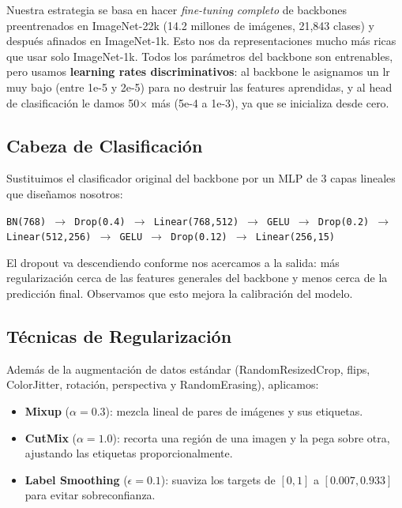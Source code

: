 \documentclass[11pt,a4paper]{article}
\begin{document}
Nuestra estrategia se basa en hacer \textit{fine-tuning completo} de backbones preentrenados en ImageNet-22k (14.2 millones de imágenes, 21,843 clases) y después afinados en ImageNet-1k. Esto nos da representaciones mucho más ricas que usar solo ImageNet-1k. Todos los parámetros del backbone son entrenables, pero usamos \textbf{learning rates discriminativos}: al backbone le asignamos un lr muy bajo (entre 1e-5 y 2e-5) para no destruir las features aprendidas, y al head de clasificación le damos 50$\times$ más (5e-4 a 1e-3), ya que se inicializa desde cero.

\subsection{Cabeza de Clasificación}

Sustituimos el clasificador original del backbone por un MLP de 3 capas lineales que diseñamos nosotros:

\begin{center}
\small
\texttt{BN(768) $\to$ Drop(0.4) $\to$ Linear(768,512) $\to$ GELU $\to$ Drop(0.2) $\to$ Linear(512,256) $\to$ GELU $\to$ Drop(0.12) $\to$ Linear(256,15)}
\end{center}

El dropout va descendiendo conforme nos acercamos a la salida: más regularización cerca de las features generales del backbone y menos cerca de la predicción final. Observamos que esto mejora la calibración del modelo.

\subsection{Técnicas de Regularización}

Además de la augmentación de datos estándar (RandomResizedCrop, flips, ColorJitter, rotación, perspectiva y RandomErasing), aplicamos:

\begin{itemize}
    \item \textbf{Mixup} ($\alpha=0.3$): mezcla lineal de pares de imágenes y sus etiquetas.
    \item \textbf{CutMix} ($\alpha=1.0$): recorta una región de una imagen y la pega sobre otra, ajustando las etiquetas proporcionalmente.
    \item \textbf{Label Smoothing} ($\epsilon=0.1$): suaviza los targets de $[0,1]$ a $[0.007, 0.933]$ para evitar sobreconfianza.
\end{itemize}
\end{document}
